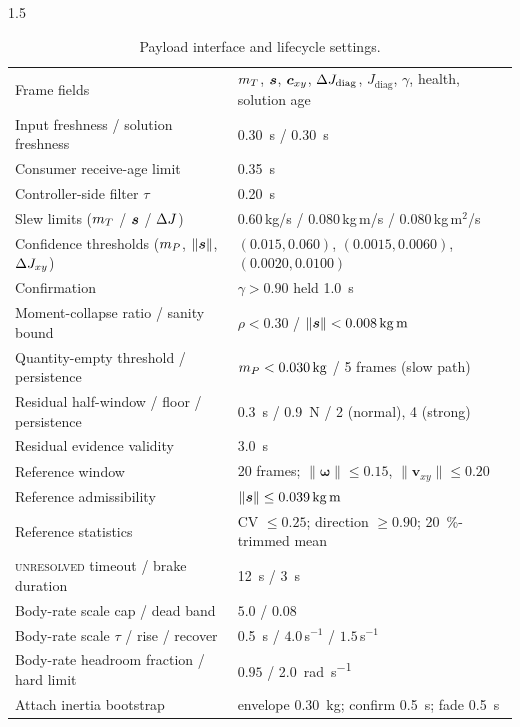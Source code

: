 \begin{appendices}
\begin{spacing}{1.5}
\begin{table}[ht]
\centering
\caption{Payload interface and lifecycle settings.}
\small
\begin{tabularx}{\textwidth}{@{}p{} X@{}}
\toprule
Frame fields & $m_T$, $\bm{s}$, $\bm{c}_{xy}$, $\Delta J_{\mathrm{diag}}$, $J_{\mathrm{diag}}$, $\gamma$, health, solution age \\
Input freshness / solution freshness & \SI{0.30}{\second} / \SI{0.30}{\second} \\
Consumer receive-age limit & \SI{0.35}{\second} \\
Controller-side filter $\tau$ & \SI{0.20}{\second} \\
Slew limits ($m_T$ / $\bm{s}$ / $\Delta J$) & $0.60$\,kg/s / $0.080$\,kg\,m/s / $0.080$\,kg\,m$^2$/s \\
Confidence thresholds ($m_P$, $\lVert\bm{s}\rVert$, $\Delta J_{xy}$) & $(0.015,0.060)$, $(0.0015,0.0060)$, $(0.0020,0.0100)$ \\
Confirmation & $\gamma>0.90$ held \SI{1.0}{\second} \\
Moment-collapse ratio / sanity bound & $\rho<0.30$ / $\lVert\svec\rVert<\SI{0.008}{\kg\meter}$ \\
Quantity-empty threshold / persistence & $\mP<\SI{0.030}{\kg}$ / 5 frames (slow path) \\
Residual half-window / floor / persistence & \SI{0.3}{\second} / \SI{0.9}{\newton} / 2 (normal), 4 (strong) \\
Residual evidence validity & \SI{3.0}{\second} \\
Reference window & 20 frames; $\lVert\bm\omega\rVert\le0.15$, $\lVert\bm v_{xy}\rVert\le0.20$ \\
Reference admissibility & $\lVert\svec\rVert\le\SI{0.039}{\kg\meter}$ \\
Reference statistics & CV $\le0.25$; direction $\ge0.90$; \SI{20}{\percent}-trimmed mean \\
\textsc{unresolved} timeout / brake duration & \SI{12}{\second} / \SI{3}{\second} \\
Body-rate scale cap / dead band & $5.0$ / $0.08$ \\
Body-rate scale $\tau$ / rise / recover & \SI{0.5}{\second} / $4.0$\,s$^{-1}$ / $1.5$\,s$^{-1}$ \\
Body-rate headroom fraction / hard limit & $0.95$ / \SI{2.0}{\radian\per\second} \\
Attach inertia bootstrap & envelope \SI{0.30}{\kg}; confirm \SI{0.5}{\second}; fade \SI{0.5}{\second} \\
\bottomrule
\end{tabularx}
\end{table}
\end{spacing}


\end{appendices}

